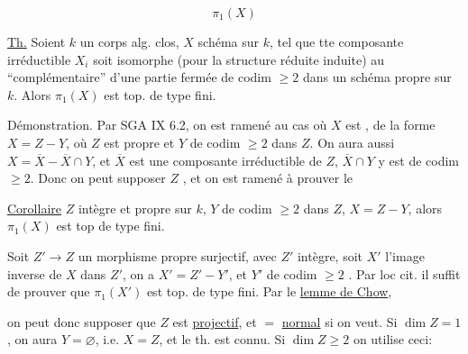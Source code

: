 \[
\pi_1(X)
\]

\uline{Th.} Soient $k$ un corps alg. clos, $X$ schéma
 sur $k$,
tel que tte composante irréductible $X_i$ soit isomorphe
(pour la structure réduite induite) au
``complémentaire'' d'une partie fermée de codim $\geq2$ dans un schéma propre
sur $k$. Alors $\pi_1(X)$ est top. de type fini.


Démonstration. Par SGA IX 6.2, on est ramené au cas où
$X$ est ,
 de la forme $X=Z-Y$, où $Z$ est propre et $Y$ de
codim $\geq2$ dans $Z$.
On aura aussi $X=\overline X-\overline X\cap Y$,
et $\overline X$ est une composante irréductible de $Z$,
$\overline X\cap Y$ y est de codim $\geq2$.
Donc on peut supposer $Z$
,
et on est ramené à prouver le

\uline{Corollaire} $Z$ intègre et propre sur $k$, $Y$  de codim $\geq2$ dans $Z$, $X=Z-Y$,
alors $\pi_1(X)$ est top de type fini.

Soit $Z'\to Z$ un morphisme propre surjectif, avec $Z'$ intègre,
soit $X'$ l'image inverse de $X$ dans $Z'$,
on a $X'=Z'-Y'$, et $Y'$ de codim $\geq2$
.
Par loc cit. il suffit de prouver que $\pi_1(X')$ est top.
de type fini. Par le \uline{lemme de Chow},

on peut donc supposer que $Z$ est \uline{projectif},
 et $=$ \uline{normal} si on veut.
Si 
$\dim Z=1$, on aura $Y=\varnothing$, i.e. $X=Z$,
et le th. est connu. Si $\dim Z\geq2$ on utilise ceci:

